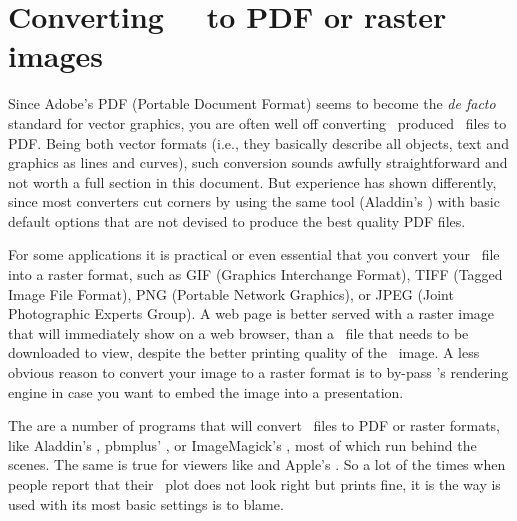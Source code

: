 \section{Converting \GMT\ \PS\ to PDF or raster images}

Since Adobe's PDF (Portable Document Format) seems to become the \emph{de facto} standard for vector graphics, you are often well off converting \GMT\ produced \PS\ files to PDF. Being both vector formats (i.e., they basically describe all objects, text and graphics as lines and curves), such conversion sounds awfully straightforward and not worth a full section in this document. But experience has shown differently, since most converters cut corners by using the same tool (Aladdin's ) with basic default options that are not devised to produce the best quality PDF files.

For some applications it is practical or even essential that you convert your \PS\ file into a raster format, such as GIF (Graphics Interchange Format), TIFF (Tagged Image File Format), PNG (Portable Network Graphics), or JPEG (Joint Photographic Experts Group). A web page is better served with a raster image that will immediately show on a web browser, than a \PS\ file that needs to be downloaded to view, despite the better printing quality of the \PS\ image. A less obvious reason to convert your image to a raster format is to by-pass 's rendering engine in case you want to embed the image into a presentation.

The are a number of programs that will convert \PS\ files to PDF or raster formats, like Aladdin's , pbmplus' , or ImageMagick's , most of which run  behind the scenes. The same is true for viewers like  and Apple's . So a lot of the times when people report that their \PS\ plot does not look right but prints fine, it is the way  is used with its most basic settings is to blame.

